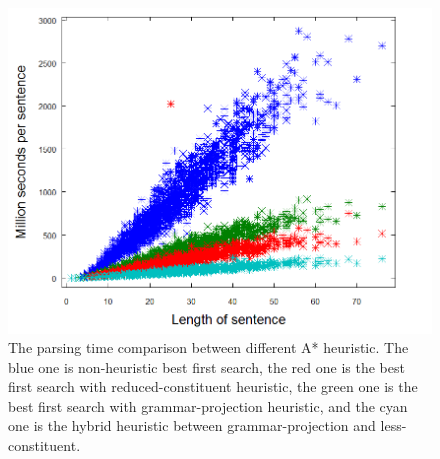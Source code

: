 \begin{figure}
	\begin{center}
		\includegraphics[scale=0.35]{Figures/SpeedAndAccuracyComparison1.png}
		\caption{\label{devExFig1} The parsing time comparison between different A* heuristic. The blue one is non-heuristic best first search, the red one is the best first search with reduced-constituent heuristic, the green one is the best first search with grammar-projection heuristic, and the cyan one is the hybrid heuristic between grammar-projection and less-constituent.}
	\end{center}
\end{figure}